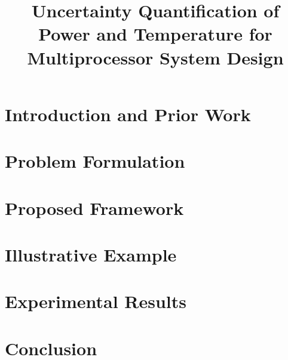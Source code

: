 \documentclass{sig-alternate}
\begin{document}
  \title{Uncertainty Quantification of Power and Temperature for Multiprocessor System Design}

  \maketitle

  \begin{abstract}
    
  \end{abstract}

  \section{Introduction and Prior Work} 
  

  \section{Problem Formulation}    
  

  \section{Proposed Framework} 
  

  \section{Illustrative Example} 
  

  \section{Experimental Results} 
  

  \section{Conclusion} 
  

  \printbibliography

  \appendix
  
\end{document}
